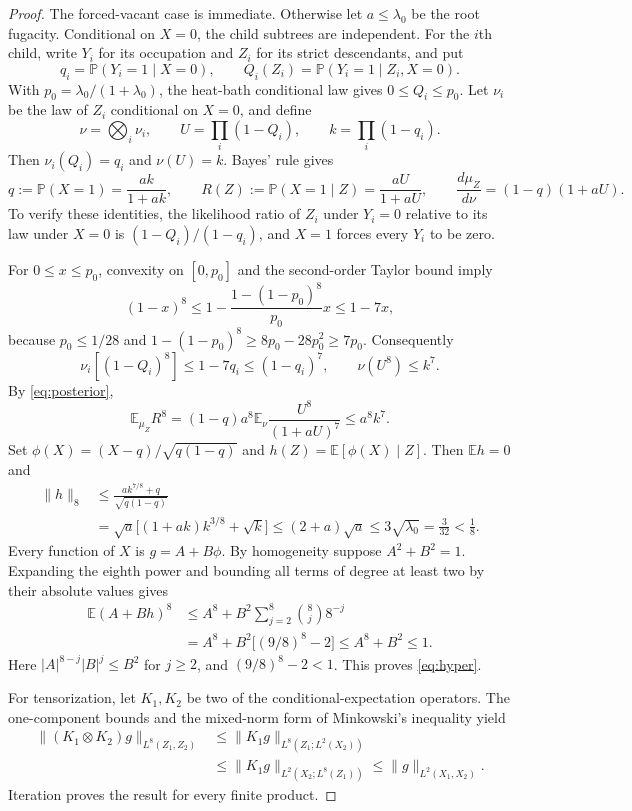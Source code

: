 \documentclass[11pt,reqno]{amsart}
\theoremstyle{remark}
\newcommand{\E}{\mathbb E}
\newcommand{\Prob}{\mathbb P}
\numberwithin{equation}{section}
\begin{document}
\begin{proof}
The forced-vacant case is immediate. Otherwise let $a\le\lambda_0$ be the root fugacity. Conditional on $X=0$, the child subtrees are independent. For the $i$th child, write $Y_i$ for its occupation and $Z_i$ for its strict descendants, and put
\[
 q_i=\Prob(Y_i=1\mid X=0),\qquad
 Q_i(Z_i)=\Prob(Y_i=1\mid Z_i,X=0).
\]
With $p_0=\lambda_0/(1+\lambda_0)$, the heat-bath conditional law gives $0\le Q_i\le p_0$. Let $\nu_i$ be the law of $Z_i$ conditional on $X=0$, and define
\[
 \nu=\bigotimes_i\nu_i,\qquad
 U=\prod_i(1-Q_i),\qquad k=\prod_i(1-q_i).
\]
Then $\nu_i(Q_i)=q_i$ and $\nu(U)=k$. Bayes' rule gives
\begin{equation}\label{eq:posterior}
 q:=\Prob(X=1)=\frac{ak}{1+ak},\qquad
 R(Z):=\Prob(X=1\mid Z)=\frac{aU}{1+aU},\qquad
 \frac{d\mu_Z}{d\nu}=(1-q)(1+aU).
\end{equation}
To verify these identities, the likelihood ratio of $Z_i$ under $Y_i=0$ relative to its law under $X=0$ is $(1-Q_i)/(1-q_i)$, and $X=1$ forces every $Y_i$ to be zero.

For $0\le x\le p_0$, convexity on $[0,p_0]$ and the second-order Taylor bound imply
\[
 (1-x)^8\le1-\frac{1-(1-p_0)^8}{p_0}x\le1-7x,
\]
because $p_0\le1/28$ and $1-(1-p_0)^8\ge8p_0-28p_0^2\ge7p_0$. Consequently
\[
 \nu_i[(1-Q_i)^8]\le1-7q_i\le(1-q_i)^7,
 \qquad \nu(U^8)\le k^7.
\]
By \eqref{eq:posterior},
\[
 \E_{\mu_Z}R^8
 =(1-q)a^8\E_\nu\frac{U^8}{(1+aU)^7}\le a^8k^7.
\]
Set $\phi(X)=(X-q)/\sqrt{q(1-q)}$ and $h(Z)=\E[\phi(X)\mid Z]$. Then $\E h=0$ and
\begin{align*}
 \|h\|_8
 &\le\frac{ak^{7/8}+q}{\sqrt{q(1-q)}}\\
 &=\sqrt a\bigl[(1+ak)k^{3/8}+\sqrt k\bigr]
 \le(2+a)\sqrt a\le3\sqrt{\lambda_0}=\frac3{32}<\frac18.
\end{align*}
Every function of $X$ is $g=A+B\phi$. By homogeneity suppose $A^2+B^2=1$. Expanding the eighth power and bounding all terms of degree at least two by their absolute values gives
\begin{align*}
 \E(A+Bh)^8
 &\le A^8+B^2\sum_{j=2}^8\binom8j8^{-j}\\
 &=A^8+B^2\bigl[(9/8)^8-2\bigr]
 \le A^8+B^2\le1.
\end{align*}
Here $|A|^{8-j}|B|^j\le B^2$ for $j\ge2$, and $(9/8)^8-2<1$. This proves \eqref{eq:hyper}.

For tensorization, let $K_1,K_2$ be two of the conditional-expectation operators. The one-component bounds and the mixed-norm form of Minkowski's inequality yield
\begin{align*}
 \|(K_1\otimes K_2)g\|_{L^8(Z_1,Z_2)}
 &\le\|K_1g\|_{L^8(Z_1;L^2(X_2))}\\
 &\le\|K_1g\|_{L^2(X_2;L^8(Z_1))}
 \le\|g\|_{L^2(X_1,X_2)}.
\end{align*}
Iteration proves the result for every finite product.
\end{proof}
\end{document}
